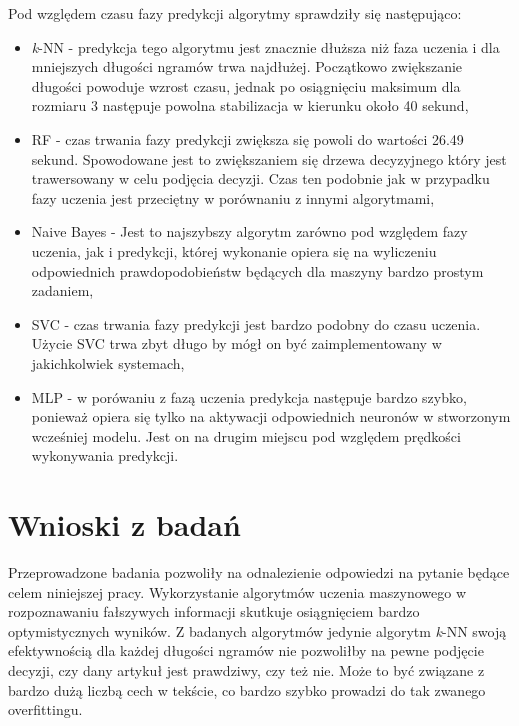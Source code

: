 \begin{itemize}
    
    Pod względem czasu fazy predykcji algorytmy sprawdziły się następująco:
    
    \begin{itemize}
        \item \textit{k}-NN -
        predykcja tego algorytmu jest znacznie dłuższa niż faza uczenia i dla mniejszych długości ngramów trwa
        najdłużej. Początkowo zwiększanie długości powoduje wzrost czasu, jednak po osiągnięciu maksimum dla rozmiaru 3
        następuje powolna stabilizacja w kierunku około 40 sekund,
        \item RF -
        czas trwania fazy predykcji zwiększa się powoli do wartości 26.49 sekund. Spowodowane jest to zwiększaniem
        się drzewa decyzyjnego który jest trawersowany w celu podjęcia decyzji. Czas ten podobnie jak w przypadku 
        fazy uczenia jest przeciętny w porównaniu z innymi algorytmami,
        \item Naive Bayes -
        Jest to najszybszy algorytm zarówno pod względem fazy uczenia, jak i predykcji, której wykonanie 
        opiera się na wyliczeniu odpowiednich prawdopodobieństw będących dla maszyny bardzo prostym zadaniem,
        \item SVC -
        czas trwania fazy predykcji jest bardzo podobny do czasu uczenia. Użycie SVC trwa zbyt długo
        by mógł on być zaimplementowany w jakichkolwiek systemach,
        \item MLP -
        w porówaniu z fazą uczenia predykcja następuje bardzo szybko, ponieważ opiera się tylko
        na aktywacji odpowiednich neuronów w stworzonym wcześniej modelu. Jest on na drugim miejscu
        pod względem prędkości wykonywania predykcji.
    \end{itemize}
\end{itemize}




\section{Wnioski z badań}
Przeprowadzone badania pozwoliły na odnalezienie odpowiedzi na pytanie 
będące celem niniejszej pracy. Wykorzystanie algorytmów uczenia maszynowego 
w rozpoznawaniu fałszywych informacji skutkuje osiągnięciem bardzo optymistycznych wyników.
Z badanych algorytmów jedynie algorytm \textit{k}-NN swoją efektywnością dla 
każdej długości ngramów nie pozwoliłby na pewne podjęcie decyzji, czy dany artykuł jest prawdziwy, czy też nie.
Może to być związane z bardzo dużą liczbą cech w tekście, co bardzo szybko prowadzi do tak zwanego 
overfittingu. 

